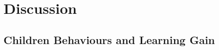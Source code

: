 %
%
%


\section{Discussion} \label{sec:tutoring_discussion}

\subsection{Children Behaviours and Learning Gain}

